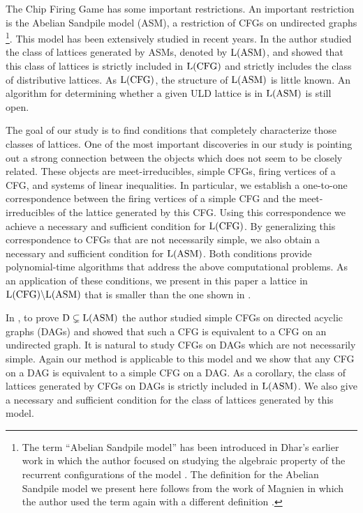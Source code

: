 \documentclass{article}
\theoremstyle{definition}
\begin{document}
The Chip Firing Game has some important restrictions. An important restriction is the Abelian Sandpile model (ASM), a restriction of CFGs on undirected graphs  \cite{Mag03,BTW87,BLS91}\footnote{The term ``Abelian Sandpile model'' has been introduced in Dhar's earlier work in which the author focused on studying the algebraic property of the recurrent configurations of the model \cite{Dha90}. The definition for the Abelian Sandpile model we present here follows from the work of Magnien in which the author used the term again with a different definition \cite{Mag03}.}. This model has been extensively studied in recent years. In \cite{Mag03} the author studied the class of lattices generated by ASMs, denoted by ${\rm L(ASM)}$, and showed that this class of lattices is strictly included in ${\rm L(CFG)}$ and strictly includes the class of distributive lattices. As ${\rm L(CFG)}$, the structure of ${\rm L(ASM)}$ is little known. An algorithm for determining whether a given ULD lattice is in ${\rm L(ASM)}$ is still open.

The goal of our study is to find conditions that completely characterize those classes of lattices. One of the most important discoveries in our study is pointing out a strong connection  between the objects which does not seem to be closely related. These objects are meet-irreducibles,  simple CFGs, firing vertices of a CFG, and systems of linear inequalities. In particular, we establish a one-to-one correspondence between the firing vertices of a simple CFG and the meet-irreducibles of the lattice generated by this CFG. Using this correspondence we achieve a necessary and sufficient condition for ${\rm L(CFG)}$. By generalizing this correspondence to CFGs that are not necessarily simple, we also obtain a necessary and sufficient condition for ${\rm L(ASM)}$. Both conditions provide polynomial-time algorithms that address the above computational problems. As an application of these conditions, we present in this paper a lattice in ${\rm L(CFG)\backslash L(ASM)}$ that is smaller than the one shown in \cite{Mag03}.



In \cite{Mag03}, to prove $\rm{D \subsetneq L(ASM)}$ the author studied simple CFGs on directed acyclic graphs (DAGs) and showed that such a CFG is equivalent to a CFG on an undirected graph. It is natural to study CFGs on DAGs which are not necessarily simple. Again our method is applicable to this model and we show that any CFG on a DAG is equivalent to a simple CFG on a DAG. As a corollary, the class of lattices generated by CFGs on DAGs is strictly included in ${\rm L(ASM)}$. We also give a necessary and sufficient condition for the class of lattices generated by this model.
\end{document}
